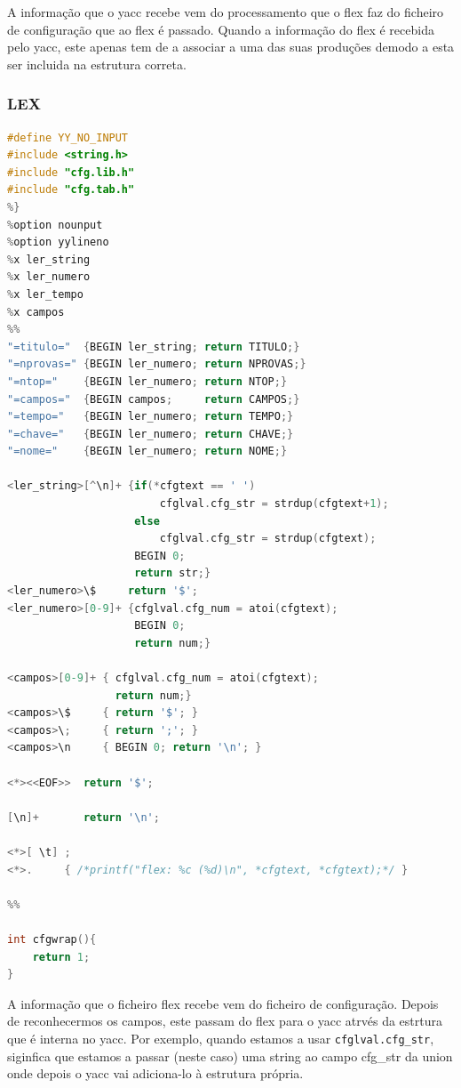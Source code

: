 \documentclass[11pt, a4paper, oneside]{article}
\begin{document}
A informação que o yacc recebe vem do processamento que o flex faz do ficheiro de configuração que ao flex é passado.
Quando a informação do flex é recebida pelo yacc, este apenas tem de a associar a uma das suas produções demodo a esta ser incluida na estrutura correta.


\newpage
\subsubsection{LEX}

\begin{lstlisting}[language=C, caption={Flex utilizado para o tratamento do ficherio de configuração}] 
%{
#define YY_NO_INPUT
#include <string.h>
#include "cfg.lib.h"
#include "cfg.tab.h"
%}
%option nounput
%option yylineno
%x ler_string
%x ler_numero
%x ler_tempo
%x campos
%%
"=titulo="  {BEGIN ler_string; return TITULO;}
"=nprovas=" {BEGIN ler_numero; return NPROVAS;}
"=ntop="    {BEGIN ler_numero; return NTOP;}
"=campos="  {BEGIN campos;     return CAMPOS;}
"=tempo="   {BEGIN ler_numero; return TEMPO;}
"=chave="   {BEGIN ler_numero; return CHAVE;}
"=nome="    {BEGIN ler_numero; return NOME;}

<ler_string>[^\n]+ {if(*cfgtext == ' ')
                        cfglval.cfg_str = strdup(cfgtext+1);
                    else
                        cfglval.cfg_str = strdup(cfgtext);
                    BEGIN 0;
                    return str;}
<ler_numero>\$     return '$';
<ler_numero>[0-9]+ {cfglval.cfg_num = atoi(cfgtext);
                    BEGIN 0;
                    return num;}

<campos>[0-9]+ { cfglval.cfg_num = atoi(cfgtext);
                 return num;}
<campos>\$     { return '$'; }
<campos>\;     { return ';'; }
<campos>\n     { BEGIN 0; return '\n'; }

<*><<EOF>>  return '$';

[\n]+       return '\n';

<*>[ \t] ;
<*>.     { /*printf("flex: %c (%d)\n", *cfgtext, *cfgtext);*/ }

%%

int cfgwrap(){
    return 1;
}
\end{lstlisting}

A informação que o ficheiro flex recebe vem do ficheiro de configuração.
Depois de reconhecermos os campos, este passam do flex para o yacc atrvés da estrtura que é interna no yacc.
Por exemplo, quando estamos a usar \texttt{cfglval.cfg\_str}, siginfica que estamos a passar (neste caso) uma string ao campo cfg\_str da union onde depois o yacc vai adiciona-lo à estrutura própria.
\end{document}
